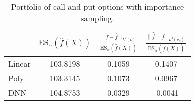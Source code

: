 \begin{table}[ht]
\centering
\begin{tabular}{lccc}
\toprule
 & $\mathrm{ES}_{\alpha}(\hat{f}(X))$ & $\frac{\|\hat f - \bar f\|_{L^2(\nu)}}{\mathrm{ES}_{\alpha}(\hat{f}(X))}$ & $\frac{\|\hat f - \bar f\|_{L^2(\hat \nu_\alpha)}}{\mathrm{ES}_{\alpha}(\hat{f}(X))}$ \\
\midrule
Linear & 103.8198 & 0.1059 & 0.1407 \\
Poly & 103.3145 & 0.1073 & 0.0967 \\
DNN & 104.8753 & 0.0329 & -0.0041 \\
\bottomrule
\end{tabular}
\caption{Portfolio of call and put options with importance sampling.}
\end{table}
